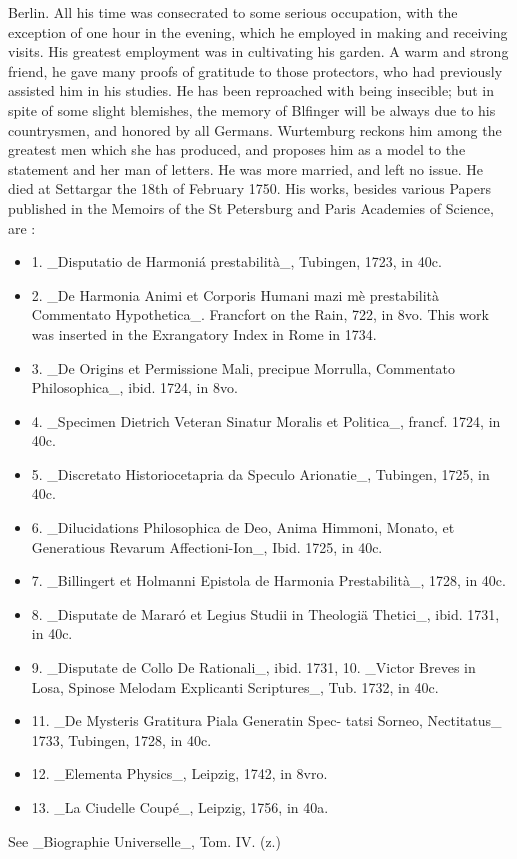 \documentclass{article}
\begin{document}
Berlin. All his time was consecrated to some serious occupation, with the exception of one hour in the evening, which he employed in making and receiving visits. His greatest employment was in cultivating his garden. A warm and strong friend, he gave many proofs of gratitude to those protectors, who had previously assisted him in his studies. He has been reproached with being insecible; but in spite of some slight blemishes, the memory of Blfinger will be always due to his countrysmen, and honored by all Germans. Wurtemburg reckons him among the greatest men which she has produced, and proposes him as a model to the statement and her man of letters. He was more married, and left no issue. He died at Settargar the 18th of February 1750. His works, besides various Papers published in the Memoirs of the St Petersburg and Paris Academies of Science, are :

\begin{itemize}
\item 1. \_Disputatio de Harmoniá prestabilità\_, Tubingen, 1723, in 40c.
\item 2. \_De Harmonia Animi et Corporis Humani mazi mè prestabilità Commentato Hypothetica\_. Francfort on the Rain, 722, in 8vo. This work was inserted in the Exrangatory Index in Rome in 1734.
\item 3. \_De Origins et Permissione Mali, precipue Morrulla, Commentato Philosophica\_, ibid. 1724, in 8vo.
\item 4. \_Specimen Dietrich Veteran Sinatur Moralis et Politica\_, francf. 1724, in 40c.
\item 5. \_Discretato Historiocetapria da Speculo Arionatie\_, Tubingen, 1725, in 40c.
\item 6. \_Dilucidations Philosophica de Deo, Anima Himmoni, Monato, et Generatious Revarum Affectioni-Ion\_, Ibid. 1725, in 40c.
\item 7. \_Billingert et Holmanni Epistola de Harmonia Prestabilità\_, 1728, in 40c.
\item 8. \_Disputate de Mararó et Legius Studii in Theologiä Thetici\_, ibid. 1731, in 40c.
\item 9. \_Disputate de Collo De Rationali\_, ibid. 1731, 10. \_Victor Breves in Losa, Spinose Melodam Explicanti Scriptures\_, Tub. 1732, in 40c.
\item 11. \_De Mysteris Gratitura Piala Generatin Spec- tatsi Sorneo, Nectitatus\_ 1733, Tubingen, 1728, in 40c.
\item 12. \_Elementa Physics\_, Leipzig, 1742, in 8vro.
\item 13. \_La Ciudelle Coupé\_, Leipzig, 1756, in 40a.
\end{itemize}
See \_Biographie Universelle\_, Tom. IV. (z.)
\end{document}
